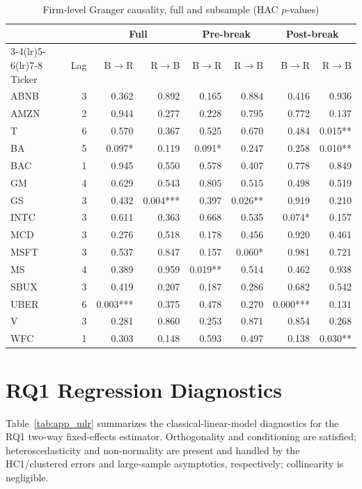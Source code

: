 \documentclass[conference]{IEEEtran}
\begin{document}
\begin{table}[!t]
\caption{Firm-level Granger causality, full and subsample (HAC $p$-values)}
\label{tab:app_granger}
\centering
\small
\begin{tabular}{lrrrrrrr}
\toprule
 & & \multicolumn{2}{c}{Full} & \multicolumn{2}{c}{Pre-break} & \multicolumn{2}{c}{Post-break} \\
\cmidrule(lr){3-4}\cmidrule(lr){5-6}\cmidrule(lr){7-8}
Ticker & Lag & B$\to$R & R$\to$B & B$\to$R & R$\to$B & B$\to$R & R$\to$B \\
\midrule
ABNB & 3 & 0.362 & 0.892 & 0.165 & 0.884 & 0.416 & 0.936 \\
AMZN & 2 & 0.944 & 0.277 & 0.228 & 0.795 & 0.772 & 0.137 \\
T    & 6 & 0.570 & 0.367 & 0.525 & 0.670 & 0.484 & 0.015** \\
BA   & 5 & 0.097* & 0.119 & 0.091* & 0.247 & 0.258 & 0.010** \\
BAC  & 1 & 0.945 & 0.550 & 0.578 & 0.407 & 0.778 & 0.849 \\
GM   & 4 & 0.629 & 0.543 & 0.805 & 0.515 & 0.498 & 0.519 \\
GS   & 3 & 0.432 & 0.004*** & 0.397 & 0.026** & 0.919 & 0.210 \\
INTC & 3 & 0.611 & 0.363 & 0.668 & 0.535 & 0.074* & 0.157 \\
MCD  & 3 & 0.276 & 0.518 & 0.178 & 0.456 & 0.920 & 0.461 \\
MSFT & 3 & 0.537 & 0.847 & 0.157 & 0.060* & 0.981 & 0.721 \\
MS   & 4 & 0.389 & 0.959 & 0.019** & 0.514 & 0.462 & 0.938 \\
SBUX & 3 & 0.419 & 0.207 & 0.187 & 0.286 & 0.682 & 0.542 \\
UBER & 6 & 0.003*** & 0.375 & 0.478 & 0.270 & 0.000*** & 0.131 \\
V    & 3 & 0.281 & 0.860 & 0.253 & 0.871 & 0.854 & 0.268 \\
WFC  & 1 & 0.303 & 0.148 & 0.593 & 0.497 & 0.138 & 0.030** \\
\bottomrule
\end{tabular}
\end{table}

\section{RQ1 Regression Diagnostics}
\label{app:mlr}
Table~\ref{tab:app_mlr} summarizes the classical-linear-model diagnostics for the
RQ1 two-way fixed-effects estimator. Orthogonality and conditioning are
satisfied; heteroscedasticity and non-normality are present and handled by the
HC1/clustered errors and large-sample asymptotics, respectively; collinearity is
negligible.
\end{document}
